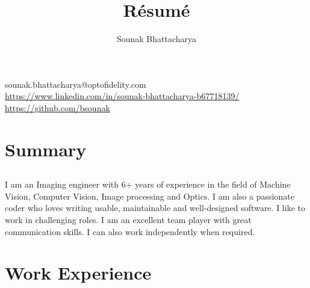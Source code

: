 \documentclass{article}
\renewcommand{\maketitle}{
\begin{center}
{\huge\bfseries
\theauthor}

\end{center}
}
\begin{document}
\title{R\'esum\'e}
\author{Sounak Bhattacharya}

\maketitle

\begin{center}
{\Large sounak.bhattacharya@optofidelity.com}\\
\url{https://www.linkedin.com/in/sounak-bhattacharya-b67718139/}\\
\url{https://github.com/bsounak} 
\end{center}

\section{Summary}
\subsection{}
I am an Imaging engineer with 6+ years of experience in the field of Machine
Vision, Computer Vision, Image processing and Optics. I am also a passionate
coder who loves writing usable, maintainable and well-designed software. I like
to work in challenging roles. I am an excellent team player with great
communication skills. I can also work independently when required.
\subsection{}

\section{Work Experience}
\end{document}
